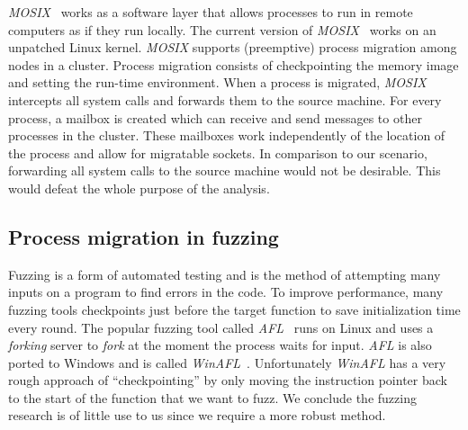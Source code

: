 \documentclass[a4paper, 11pt, english]{report}
\begin{document}
\textit{MOSIX}~\cite{mosix} works as a software layer that allows processes to run in remote computers as if they run locally. The current version of \textit{MOSIX}~\cite{mosix} works on an unpatched Linux kernel. \textit{MOSIX} supports (preemptive) process migration among nodes in a cluster. Process migration consists of checkpointing the memory image and setting the run-time environment.
When a process is migrated, \textit{MOSIX} intercepts all system calls and forwards them to the source machine.
For every process, a mailbox is created which can receive and send messages to other processes in the cluster. These mailboxes work independently of the location of the process and allow for migratable sockets. In comparison to our scenario, forwarding all system calls to the source machine would not be desirable. This would defeat the whole purpose of the analysis.


\subsection{Process migration in fuzzing}
\label{sec:related-other-uses}
Fuzzing is a form of automated testing and is the method of attempting many inputs on a program to find errors in the code. To improve performance, many fuzzing tools checkpoints just before the target function to save initialization time every round. The popular fuzzing tool called \textit{AFL}~\cite{afl} runs on Linux and uses a \textit{forking} server to \textit{fork} at the moment the process waits for input. \textit{AFL} is also ported to Windows and is called \textit{WinAFL}~\cite{winafl}. Unfortunately \textit{WinAFL} has a very rough approach of ``checkpointing'' by only moving the instruction pointer back to the start of the function that we want to fuzz. We conclude the fuzzing research is of little use to us since we require a more robust method.
\end{document}
